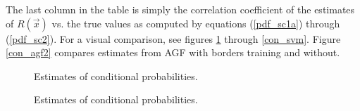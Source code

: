 The last column in the table is simply the correlation coefficient of the
estimates of $R(\vec x)$ vs. the true values as computed by equations
(\ref{pdf_sc1a}) through (\ref{pdf_sc2}).  For a visual comparison, see figures
\ref{con_knn} through \ref{con_svm}.  Figure \ref{con_agf2} compares
estimates from AGF with borders training and without.

\begin{figure}
  \caption{Estimates of conditional probabilities.}
  \label{con_knn}
\end{figure}

\begin{figure}
  \caption{Estimates of conditional probabilities.}
  \label{con_agf}
\end{figure}

